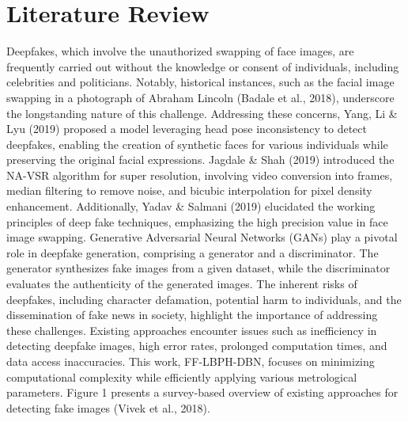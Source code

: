 \chapter{Literature Review}
Deepfakes, which involve the unauthorized swapping of face images, are frequently carried out without the knowledge or consent of individuals, including celebrities and politicians. Notably, historical instances, such as the facial image swapping in a photograph of Abraham Lincoln (Badale et al., 2018), underscore the longstanding nature of this challenge. Addressing these concerns, Yang, Li \& Lyu (2019) proposed a model leveraging head pose inconsistency to detect deepfakes, enabling the creation of synthetic faces for various individuals while preserving the original facial expressions.
Jagdale \& Shah (2019) introduced the NA-VSR algorithm for super resolution, involving video conversion into frames, median filtering to remove noise, and bicubic interpolation for pixel density enhancement. Additionally, Yadav \& Salmani (2019) elucidated the working principles of deep fake techniques, emphasizing the high precision value in face image swapping.
Generative Adversarial Neural Networks (GANs) play a pivotal role in deepfake generation, comprising a generator and a discriminator. The generator synthesizes fake images from a given dataset, while the discriminator evaluates the authenticity of the generated images. The inherent risks of deepfakes, including character defamation, potential harm to individuals, and the dissemination of fake news in society, highlight the importance of addressing these challenges.
Existing approaches encounter issues such as inefficiency in detecting deepfake images, high error rates, prolonged computation times, and data access inaccuracies. This work, FF-LBPH-DBN, focuses on minimizing computational complexity while efficiently applying various metrological parameters. Figure 1 presents a survey-based overview of existing approaches for detecting fake images (Vivek et al., 2018).

